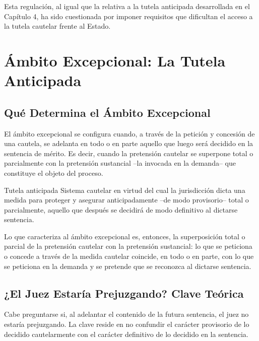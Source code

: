 \documentclass[12pt,oneside]{book}
\begin{document}
\begin{note}
Esta regulación, al igual que la relativa a la tutela anticipada desarrollada en el Capítulo 4, ha sido cuestionada por imponer requisitos que dificultan el acceso a la tutela cautelar frente al Estado.
\end{note}

\chapter[Ámbito Excepcional: Tutela Anticipada]{Ámbito Excepcional: La Tutela Anticipada}

\section{Qué Determina el Ámbito Excepcional}

El ámbito excepcional se configura cuando, a través de la petición y concesión de una cautela, se adelanta en todo o en parte aquello que luego será decidido en la sentencia de mérito. Es decir, cuando la pretensión cautelar se superpone total o parcialmente con la pretensión sustancial --la invocada en la demanda-- que constituye el objeto del proceso.

\begin{definition}{Tutela anticipada}
Sistema cautelar en virtud del cual la jurisdicción dicta una medida para proteger y asegurar anticipadamente --de modo provisorio-- total o parcialmente, aquello que después se decidirá de modo definitivo al dictarse sentencia.
\end{definition}

Lo que caracteriza al ámbito excepcional es, entonces, la superposición total o parcial de la pretensión cautelar con la pretensión sustancial: lo que se peticiona o concede a través de la medida cautelar coincide, en todo o en parte, con lo que se peticiona en la demanda y se pretende que se reconozca al dictarse sentencia.

\section{¿El Juez Estaría Prejuzgando? Clave Teórica}

Cabe preguntarse si, al adelantar el contenido de la futura sentencia, el juez no estaría prejuzgando. La clave reside en no confundir el carácter provisorio de lo decidido cautelarmente con el carácter definitivo de lo decidido en la sentencia.
\end{document}
